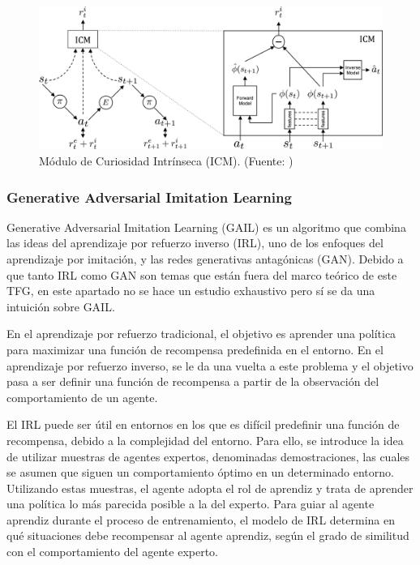 \begin{figure}[H]
    \centering
    \includegraphics[width=15cm]{figures/curiosity.jpg}
    \caption[Módulo de Curiosidad Intrínseca (ICM)]{Módulo de Curiosidad Intrínseca (ICM). (Fuente: \cite{pathak2017curiosity})}
    \label{fig:icm}
\end{figure}

\subsubsection{Generative Adversarial Imitation Learning}

Generative Adversarial Imitation Learning (GAIL) \cite{ho2016generative} es un algoritmo que combina las ideas del aprendizaje por refuerzo inverso (IRL), uno de los enfoques del aprendizaje por imitación, y las redes generativas antagónicas (GAN). Debido a que tanto IRL como GAN son temas que están fuera del marco teórico de este TFG, en este apartado no se hace un estudio exhaustivo pero sí se da una intuición sobre GAIL.

En el aprendizaje por refuerzo tradicional, el objetivo es aprender una política para maximizar una función de recompensa predefinida en el entorno. En el aprendizaje por refuerzo inverso, se le da una vuelta a este problema y el objetivo pasa a ser definir una función de recompensa a partir de la observación del comportamiento de un agente.

El IRL puede ser útil en entornos en los que es difícil predefinir una función de recompensa, debido a la complejidad del entorno. Para ello, se introduce la idea de utilizar muestras de agentes expertos, denominadas demostraciones, las cuales se asumen que siguen un comportamiento óptimo en un determinado entorno. Utilizando estas muestras, el agente adopta el rol de aprendiz y trata de aprender una política lo más parecida posible a la del experto. Para guiar al agente aprendiz durante el proceso de entrenamiento, el modelo de IRL determina en qué situaciones debe recompensar al agente aprendiz, según el grado de similitud con el comportamiento del agente experto.

